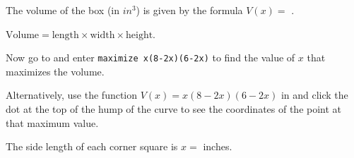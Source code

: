 \documentclass{ximera}
\begin{document}
\begin{question}
The volume of the box (in $\si{in^3}$) is given by the formula $V(x)=$ .
\begin{hint}
$\text{Volume}=\text{length}\times\text{width}\times\text{height}$.
\end{hint}

Now go to  and enter \texttt{maximize x(8-2x)(6-2x)} to find the value of $x$ that maximizes the volume. 

Alternatively, use the function $V(x)=x(8-2x)(6-2x)$ in  and click the dot at the top of the hump of the curve to see the coordinates of the point at that maximum value.

The side length of each corner square is  $x=$  inches.

\end{question}
\end{document}
